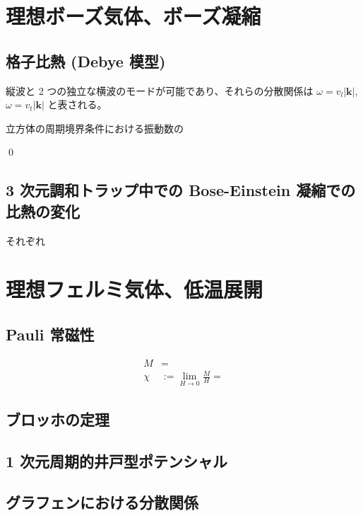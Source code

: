 \documentclass[uplatex,dvipdfmx,a4paper,11pt]{jlreq}
\makeatletter
\newcommand{\kk}{\bm{k}}
\theoremstyle{definition}
\renewenvironment{proof}[1][\proofname]{\par
  \normalfont
  \topsep6\p@\@plus6\p@ \trivlist
  \item[\hskip\labelsep{\bfseries #1}\@addpunct{\bfseries}]\ignorespaces\quad\par
}{%
  \qed\endtrivlist\@endpefalse
}
\renewcommand\proofname{証明}
\makeatother
\begin{document}
\section{理想ボーズ気体、ボーズ凝縮}
\subsection{格子比熱 (Debye 模型)}
縦波と 2 つの独立な横波のモードが可能であり、それらの分散関係は $\omega = v_l|\kk|$, $\omega = v_t|\kk|$ と表される。
\begin{problem}
立方体の周期境界条件における振動数の
\end{problem}
\begin{proof}

\end{proof}

\subsection{3 次元調和トラップ中での Bose-Einstein 凝縮での比熱の変化}
それぞれ

\section{理想フェルミ気体、低温展開}
\subsection{Pauli 常磁性}
\begin{problem}
\begin{align}
  M    & =                             \\
  \chi & := \lim_{H\to 0}\frac{M}{H} =
\end{align}
\end{problem}

\subsection{ブロッホの定理}

\subsection{1 次元周期的井戸型ポテンシャル}

\subsection{グラフェンにおける分散関係}
\end{document}

